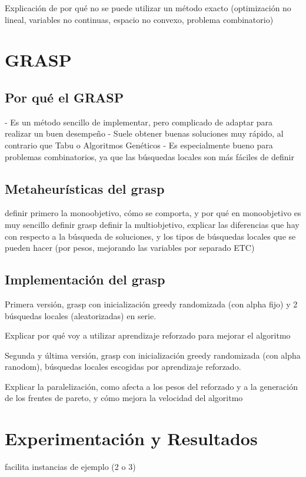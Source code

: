 \documentclass[12pt,a4paper]{book}
\begin{document}
Explicación de por qué no se puede utilizar un método exacto (optimización no lineal, variables no continuas, espacio no convexo, problema combinatorio)



\chapter{GRASP}
\section{Por qué el GRASP}
- Es un método sencillo de implementar, pero complicado de adaptar para realizar un buen desempeño
- Suele obtener buenas soluciones muy rápido, al contrario que Tabu o Algoritmos Genéticos
- Es especialmente bueno para problemas combinatorios, ya que las búsquedas locales son más fáciles de definir

\section{Metaheurísticas del grasp}
definir primero la monoobjetivo, cómo se comporta, y por qué en monoobjetivo es muy sencillo definir grasp
definir la multiobjetivo, explicar las diferencias que hay con respecto a la búsqueda de soluciones, y los tipos de búsquedas locales que se pueden hacer (por pesos, mejorando las variables por separado ETC)

\section{Implementación del grasp}
Primera versión, grasp con inicialización greedy randomizada (con alpha fijo) y 2 búsquedas locales (aleatorizadas) en serie.

Explicar por qué voy a utilizar aprendizaje reforzado para mejorar el algoritmo

Segunda y última versión, grasp con inicialización greedy randomizada (con alpha ranodom), búsquedas locales escogidas por aprendizaje reforzado.

Explicar la paralelización, como afecta a los pesos del reforzado y a la generación de los frentes de pareto, y cómo mejora la velocidad del algoritmo

\chapter{Experimentación y Resultados}facilita
instancias de ejemplo (2 o 3)
\end{document}
